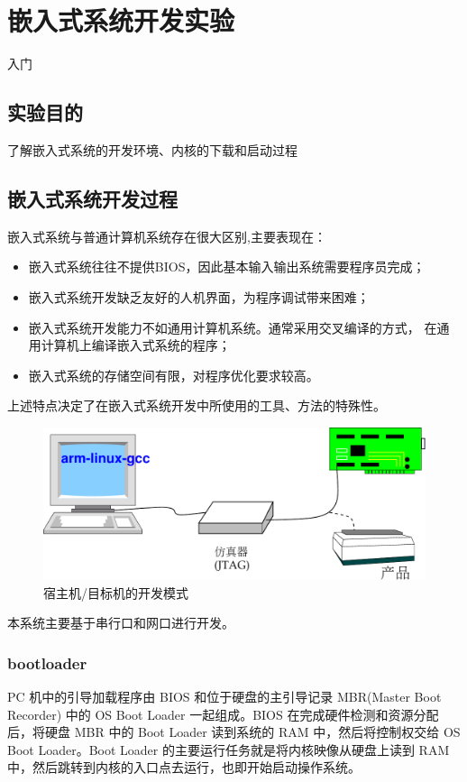\chapter{嵌入式系统开发实验}{入门}\label{ch-env}

\section{实验目的}
    了解嵌入式系统的开发环境、内核的下载和启动过程

\section{嵌入式系统开发过程}
    嵌入式系统与普通计算机系统存在很大区别,主要表现在：
\begin{itemize}\itemsep=-3pt
  \item 嵌入式系统往往不提供BIOS，因此基本输入输出系统需要程序员完成；
  \item 嵌入式系统开发缺乏友好的人机界面，为程序调试带来困难；
  \item 嵌入式系统开发能力不如通用计算机系统。通常采用交叉编译的方式，
        在通用计算机上编译嵌入式系统的程序；
  \item 嵌入式系统的存储空间有限，对程序优化要求较高。
\end{itemize}
    上述特点决定了在嵌入式系统开发中所使用的工具、方法的特殊性。

\begin{figure}[!h]
\centering
  \includegraphics[width=.55\textwidth]{host-obj}
\caption{宿主机/目标机的开发模式}
\end{figure}

    本系统主要基于串行口和网口进行开发。

\subsection{bootloader}
	PC 机中的引导加载程序由 BIOS 和位于硬盘的主引导记录 MBR(Master Boot
Recorder) 中的 OS Boot Loader 一起组成。BIOS 在完成硬件检测和资源分配
后，将硬盘 MBR 中的 Boot Loader 读到系统的 RAM 中，然后将控制权交给
OS Boot Loader。Boot Loader 的主要运行任务就是将内核映像从硬盘上读到
RAM 中，然后跳转到内核的入口点去运行，也即开始启动操作系统。

